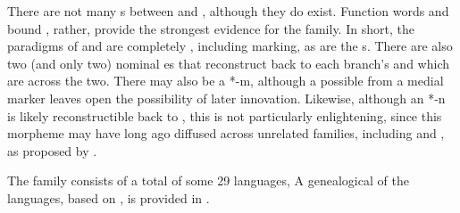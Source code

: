 There are not many  s between  and , although they do exist. Function words and  bound , rather, provide the strongest evidence for the  family. In short, the  paradigms of  and  are completely , including  marking, as are the  s. There are also two (and only two) nominal  es that reconstruct back to each branch’s  and which are  across the two. There may also be a   *-m, although a possible  from a medial  marker leaves open the possibility of later innovation. Likewise, although an  *-n is likely reconstructible back to , this is not particularly enlightening, since this morpheme may have long ago diffused across unrelated families, including  and , as proposed by \citet[68]{Foley1986}.

 The  family consists of a total of some 29 languages, A genealogical  of the  languages, based on \citet{UsherBarlow}, is provided in .


